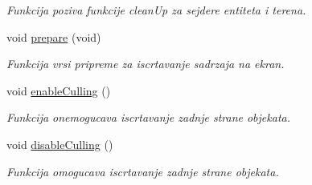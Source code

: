 \begin{DoxyCompactItemize}
\begin{DoxyCompactList}\small\item\em Funkcija poziva funkcije clean\+Up za sejdere entiteta i terena. \end{DoxyCompactList}\item 
void \hyperlink{classcore_1_1MainRenderer_a8e8be03c3b1f51ce0721cf52aa8f0f3c}{prepare} (void)
\begin{DoxyCompactList}\small\item\em Funkcija vrsi pripreme za iscrtavanje sadrzaja na ekran. \end{DoxyCompactList}\item 
void \hyperlink{classcore_1_1MainRenderer_abf659aace3015f29db1c3ea9561fff2f}{enable\+Culling} ()
\begin{DoxyCompactList}\small\item\em Funkcija onemogucava iscrtavanje zadnje strane objekata. \end{DoxyCompactList}\item 
void \hyperlink{classcore_1_1MainRenderer_a00a3d49faabb02f0984f521208681ac4}{disable\+Culling} ()
\begin{DoxyCompactList}\small\item\em Funkcija omogucava iscrtavanje zadnje strane objekata. \end{DoxyCompactList}\end{DoxyCompactItemize}
